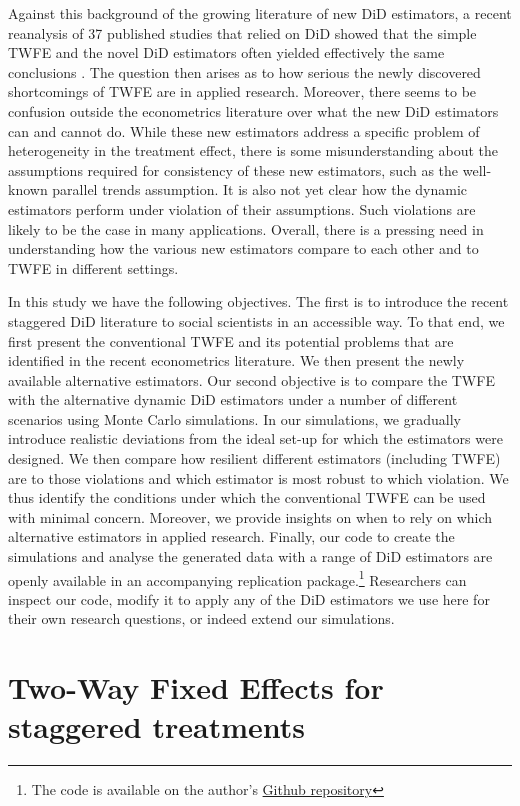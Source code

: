 Against this background of the growing literature of new DiD estimators, a recent reanalysis of 37 published studies that relied on DiD showed that the simple TWFE and the novel DiD estimators often yielded effectively the same conclusions \cite{Chiu.2023}. The question then arises as to how serious the newly discovered shortcomings of TWFE are in applied research. Moreover, there seems to be confusion outside the econometrics literature over what the new DiD estimators can and cannot do. While these new estimators address a specific problem of heterogeneity in the treatment effect, there is some misunderstanding about the assumptions required for consistency of these new estimators, such as the well-known parallel trends assumption. It is also not yet clear how the dynamic estimators perform under violation of their assumptions. Such violations are likely to be the case in many applications. Overall, there is a pressing need in understanding how the various new estimators compare to each other and to TWFE in different settings.

In this study we have the following objectives. The first is to introduce the recent staggered DiD literature to social scientists in an accessible way. To that end, we first present the conventional TWFE and its potential problems that are identified in the recent econometrics literature. We then present the newly available alternative estimators. Our second objective is to compare the TWFE with the alternative dynamic DiD estimators under a number of different scenarios using Monte Carlo simulations. In our simulations, we gradually introduce realistic deviations from the ideal set-up for which the estimators were designed. We then compare how resilient different estimators (including TWFE) are to those violations and which estimator is most robust to which violation. We thus identify the conditions under which the conventional TWFE can be used with minimal concern. Moreover, we provide insights on when to rely on which alternative estimators in applied research. Finally, our code to create the simulations and analyse the generated data with a range of DiD estimators are openly available in an accompanying replication package.\footnote{The code is available on the author's \href{https://github.com/ruettenauer/did_sim}{Github repository}} Researchers can inspect our code, modify it to apply any of the DiD estimators we use here for their own research questions, or indeed extend our simulations.

\section{Two-Way Fixed Effects for staggered treatments}

